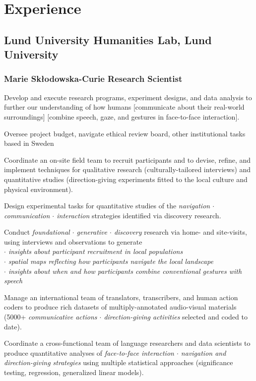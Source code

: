 \documentclass[11pt, oneside]{memoir}
\newcommand{\position}[2]{
     \subsubsection{#1\hfill\mdseries{#2}}}
\begin{document}
\section{Experience}
\subsection{Lund University Humanities Lab, Lund University}
\position{Marie Skłodowska-Curie Research Scientist}{2019--present}

Develop and execute research programs, experiment designs, and data analysis to further our understanding of how humans [communicate about their real-world surroundings] [combine speech, gaze, and gestures in face-to-face interaction]. 

Oversee project budget, navigate ethical review board, other institutional tasks based in Sweden

Coordinate an on-site field team to recruit participants and to devise, refine, and implement techniques for qualitative research (culturally-tailored interviews) and quantitative studies (direction-giving experiments fitted to the local culture and physical environment). 

Design experimental tasks for quantitative studies of the \emph{navigation $\cdot$ communication $\cdot$ interaction} strategies identified via discovery research.   

Conduct \emph{foundational $\cdot$ generative $\cdot$ discovery} research via home- and site-visits, using interviews and observations to generate\\ \emph{
$\cdot$ insights about participant recruitment in local populations \\
$\cdot$ spatial maps reflecting how participants navigate the local landscape \\
$\cdot$ insights about when and how participants combine conventional gestures with speech
}


Manage an international team of translators, transcribers, and human action coders to produce rich datasets of multiply-annotated audio-visual materials (5000+ \emph{communicative actions $\cdot$ direction-giving activities} selected and coded to date).  

Coordinate a cross-functional team of language researchers and data scientists to produce quantitative analyses of  \emph{face-to-face interaction $\cdot$ navigation and direction-giving strategies} using multiple statistical approaches (significance testing, regression, generalized linear models).
\end{document}
